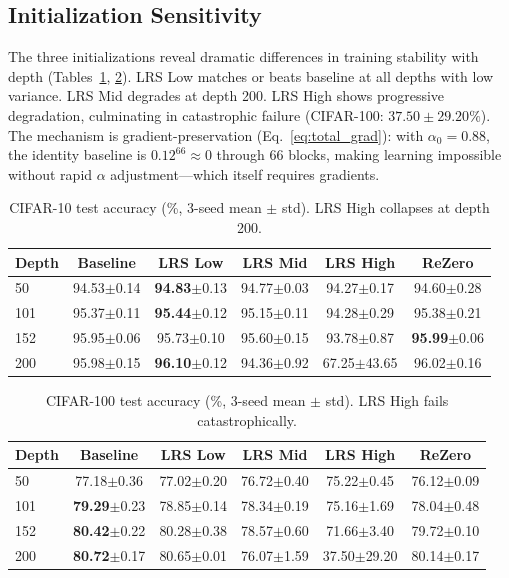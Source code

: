 \documentclass{bmvc2k}
\begin{document}
\subsection{Initialization Sensitivity}
\label{sec:init_sensitivity}

The three initializations reveal dramatic differences in training stability with depth (Tables~\ref{tab:cifar10}, \ref{tab:cifar100}). LRS Low matches or beats baseline at all depths with low variance. LRS Mid degrades at depth 200. LRS High shows progressive degradation, culminating in catastrophic failure (CIFAR-100: $37.50 \pm 29.20\%$). The mechanism is gradient-preservation (Eq.~\ref{eq:total_grad}): with $\alpha_0 = 0.88$, the identity baseline is $0.12^{66} \approx 0$ through 66 blocks, making learning impossible without rapid $\alpha$ adjustment---which itself requires gradients.

\begin{table}[!ht]
\centering
\small
\caption{CIFAR-10 test accuracy (\%, 3-seed mean $\pm$ std). LRS High collapses at depth 200.}
\label{tab:cifar10}
\begin{tabular}{lccccc}
\toprule
\textbf{Depth} & \textbf{Baseline} & \textbf{LRS Low} & \textbf{LRS Mid} & \textbf{LRS High} & \textbf{ReZero} \\
\midrule
50  & 94.53$\pm$0.14 & \textbf{94.83}$\pm$0.13 & 94.77$\pm$0.03 & 94.27$\pm$0.17 & 94.60$\pm$0.28 \\
101 & 95.37$\pm$0.11 & \textbf{95.44}$\pm$0.12 & 95.15$\pm$0.11 & 94.28$\pm$0.29 & 95.38$\pm$0.21 \\
152 & 95.95$\pm$0.06 & 95.73$\pm$0.10 & 95.60$\pm$0.15 & 93.78$\pm$0.87 & \textbf{95.99}$\pm$0.06 \\
200 & 95.98$\pm$0.15 & \textbf{96.10}$\pm$0.12 & 94.36$\pm$0.92 & 67.25$\pm$43.65 & 96.02$\pm$0.16 \\
\bottomrule
\end{tabular}
\end{table}

\begin{table}[!ht]
\centering
\small
\caption{CIFAR-100 test accuracy (\%, 3-seed mean $\pm$ std). LRS High fails catastrophically.}
\label{tab:cifar100}
\begin{tabular}{lccccc}
\toprule
\textbf{Depth} & \textbf{Baseline} & \textbf{LRS Low} & \textbf{LRS Mid} & \textbf{LRS High} & \textbf{ReZero} \\
\midrule
50  & 77.18$\pm$0.36 & 77.02$\pm$0.20 & 76.72$\pm$0.40 & 75.22$\pm$0.45 & 76.12$\pm$0.09 \\
101 & \textbf{79.29}$\pm$0.23 & 78.85$\pm$0.14 & 78.34$\pm$0.19 & 75.16$\pm$1.69 & 78.04$\pm$0.48 \\
152 & \textbf{80.42}$\pm$0.22 & 80.28$\pm$0.38 & 78.57$\pm$0.60 & 71.66$\pm$3.40 & 79.72$\pm$0.10 \\
200 & \textbf{80.72}$\pm$0.17 & 80.65$\pm$0.01 & 76.07$\pm$1.59 & 37.50$\pm$29.20 & 80.14$\pm$0.17 \\
\bottomrule
\end{tabular}
\end{table}
\end{document}
